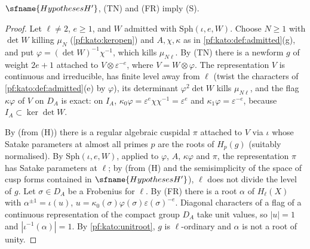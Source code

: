 \begin{theorem}\label{pf:kato:srcs}
$\sfname{HypothesesH'}$, \textup{(TN)} and \textup{(FR)} imply \textup{(S)}.
\end{theorem}

\begin{proof}
Let $\ell\ne2$, $e\ge1$, and $W$ admitted with $\mathrm{Sph}(\iota,e,W)$. Choose $N\ge1$ with $\det W$ killing
$\mu_N$ (\cref{pf:kato:keropen}) and $A,\chi,\kappa$ as in \cref{pf:kato:def:admitted}(g), and put
$\varphi=(\det W)^{-1}\chi^{-1}$, which kills $\mu_{N\ell}$. By \textup{(TN)} there is a newform $g$ of weight
$2e+1$ attached to $V\otimes\varepsilon^{-e}$, where $V=W\otimes\varphi$. The representation $V$ is continuous and
irreducible, has finite level away from $\ell$ (twist the characters of \cref{pf:kato:def:admitted}(e) by $\varphi$),
its determinant $\varphi^2\det W$ kills $\mu_{N\ell}$, and the flag $\kappa\varphi$ of $V$ on $D_A$ is exact: on $I_A$,
$\kappa_0\varphi=\varepsilon^e\chi\chi^{-1}=\varepsilon^e$ and $\kappa_1\varphi=\varepsilon^{-e}$, because $I_A\subset\ker\det W$.

By  (from \textup{(H)}) there is a regular algebraic
cuspidal $\pi$ attached to $V$ via $\iota$ whose Satake parameters at almost all primes $p$ are the roots of
$H_p(g)$ (suitably normalised). By $\mathrm{Sph}(\iota,e,W)$, applied to $\varphi$, $A$, $\kappa\varphi$ and $\pi$, the
representation $\pi$ has Satake parameters at $\ell$; by
 (from \textup{(H)} and the
semisimplicity of the space of cusp forms contained in $\sfname{HypothesesH'}$), $\ell$ does not divide the level
of $g$. Let $\sigma\in D_A$ be a Frobenius for $\ell$. By \textup{(FR)} there is a root $\alpha$ of $H_\ell(X)$ with
$\alpha^{\pm1}=\iota(u)$, $u=\kappa_0(\sigma)\varphi(\sigma)\varepsilon(\sigma)^{-e}$. Diagonal characters of a flag of a continuous
representation of the compact group $D_A$ take unit values, so $|u|=1$ and $|\iota^{-1}(\alpha)|=1$. By \cref{pf:kato:unitroot},
$g$ is $\ell$-ordinary and $\alpha$ is not a root of unity.


\end{proof}
